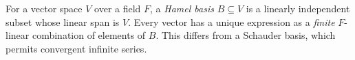 
For a vector space $V$ over a field $F$, a \emph{Hamel basis} $B\subseteq V$ is a linearly independent subset whose linear span is $V$. Every vector has a unique expression as a \emph{finite} $F$-linear combination of elements of $B$. This differs from a Schauder basis, which permits convergent infinite series.
